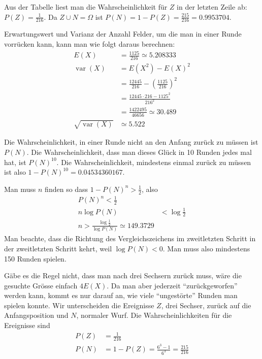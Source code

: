 \begin{loesung}
\begin{center}
\begin{tabular}{|ccc|c|r|r|r|}
\hline
\end{tabular}
\end{center}
\begin{teilaufgaben}
\item Aus der Tabelle liest man die Wahrscheinlichkeit für $Z$ in der letzten
Zeile ab: $P(Z)=\frac1{216}$. Da $Z\cup N=\Omega$ ist
$P(N)=1-P(Z)=\frac{215}{216}=0.9953704$.
\item
Erwartungswert und Varianz der Anzahl Felder, um die man in einer Runde vorrücken kann,
kann man wie folgt daraus berechnen:
\begin{align*}
E(X)
&=\frac{1125}{216}\simeq 5.208333
\\
\operatorname{var}(X)
&= E(X^2)-E(X)^2\\
&=\frac{12445}{216}-\left(\frac{1125}{216}\right)^2\\
&=\frac{12445\cdot 216  - 1125^2}{216^2}\\
&=\frac{1422495}{46656}\simeq 30.489\\
\sqrt{\operatorname{var}(X)}&\simeq 5.522
\end{align*}
\item
Die Wahrscheinlichkeit, in einer Runde nicht an den Anfang zurück
zu müssen ist $P(N)$. Die Wahrscheinlichkeit, dass man dieses
Glück in 10 Runden jedes mal hat, ist $P(N)^{10}$. Die Wahrscheinlichkeit,
mindestens einmal zurück zu müssen ist also $1-P(N)^{10}=0.04534360167$.
\item
Man muss $n$ finden so dass $1-P(N)^n>\frac12$, also
\begin{align*}
P(N)^n<\frac12\\
n\log P(N)&<\log\frac12\\
n>\frac{\log\frac12}{\log P(N)}\simeq 149.3729
\end{align*}
Man beachte, dass die Richtung des Vergleichszeichens im zweitletzten Schritt
in der zweitletzten  Schritt kehrt, weil $\log P(N) < 0$. Man muss also mindestens
150 Runden spielen.
\item
Gäbe es die Regel nicht, dass man nach drei Sechsern zurück muss,
wäre die gesuchte Grösse einfach $4 E(X)$. Da man aber
jederzeit ``zurückgeworfen'' werden kann, kommt es nur darauf an,
wie viele ``ungestörte'' Runden man spielen konnte.
Wir unterscheiden die Ereignisse $Z$, drei Sechser, zurück auf die
Anfangsposition und $N$, normaler Wurf. Die Wahrscheinlichkeiten für
die Ereignisse sind
\begin{align*}
P(Z)&= \frac1{216}\\
P(N)&= 1-P(Z)=\frac{6^3-1}{6^3}=\frac{215}{216}

\end{align*}
\end{teilaufgaben}
\end{loesung}
